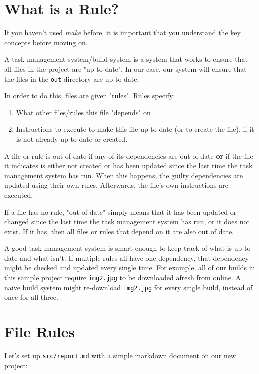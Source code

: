 \documentclass[]{article}
\begin{document}
\section{What is a Rule?}

If you haven't used \emph{make} before, it is important that you understand the
key concepts before moving on.

A task management system/build system is a system that works to ensure that all
files in the project are "up to date". In our case, our system will ensure that
the files in the \texttt{out} directory are up to date.

In order to do this, files are given "rules". Rules specify:

\begin{enumerate}
\item
  What other files/rules this file "depends" on
\item
  Instructions to execute to make this file up to date (or to create the file),
  if it is not already up to date or created.
\end{enumerate}

A file or rule is out of date if any of its dependencies are out of date
\textbf{or} if the file it indicates is either not created or has been updated
since the last time the task management system has run. When this happens, the
guilty dependencies are updated using their own rules. Afterwards, the file's
own instructions are executed.

If a file has no rule, "out of date" simply means that it has been updated or
changed since the last time the task management system has run, or it does not
exist. If it has, then all files or rules that depend on it are also out of
date.

A good task management system is smart enough to keep track of what is up to
date and what isn't. If multiple rules all have one dependency, that dependency
might be checked and updated every single time. For example, all of our builds
in this sample project require \texttt{img2.jpg} to be downloaded afresh from
online. A naive build system might re-download \texttt{img2.jpg} for every
single build, instead of once for all three.

\section{File Rules}

Let's set up \texttt{src/report.md} with a simple markdown document on our new
project:
\end{document}
